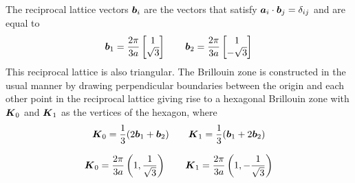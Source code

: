 The reciprocal lattice vectors $\boldsymbol{b}_i$ are the vectors that satisfy $\boldsymbol{a}_i\cdot \boldsymbol{b}_j=\delta_{ij}$ and are equal to 
\begin{equation}
    \boldsymbol{b}_1=\frac{2\pi}{3a}\begin{bmatrix}
        1 \\ \sqrt 3
    \end{bmatrix}
    \quad \quad
    \boldsymbol{b}_2=\frac{2\pi}{3a}\begin{bmatrix}
        1 \\ -\sqrt 3
    \end{bmatrix}
\end{equation}
This reciprocal lattice is also triangular. The Brillouin zone is constructed in the usual manner by drawing perpendicular boundaries between the origin and each other point in the reciprocal lattice giving rise to a hexagonal Brillouin zone with $\boldsymbol{K}_0$ and $\boldsymbol{K}_1$ as the vertices of the hexagon, where 
\[
    \boldsymbol{K}_0=\frac 13 (2\boldsymbol{b}_1+\boldsymbol{b}_2)\quad \quad \boldsymbol{K}_1=\frac 13 (\boldsymbol{b}_1+2\boldsymbol{b}_2)
\]

\begin{equation}
   \boldsymbol{K}_0=\frac{2\pi}{3a}\left(1,\frac 1{\sqrt 3}\right)\quad\quad \boldsymbol{K}_1=\frac{2\pi}{3a}\left(1,-\frac 1{\sqrt 3}\right)
   \label{eq:K_points}
\end{equation}













